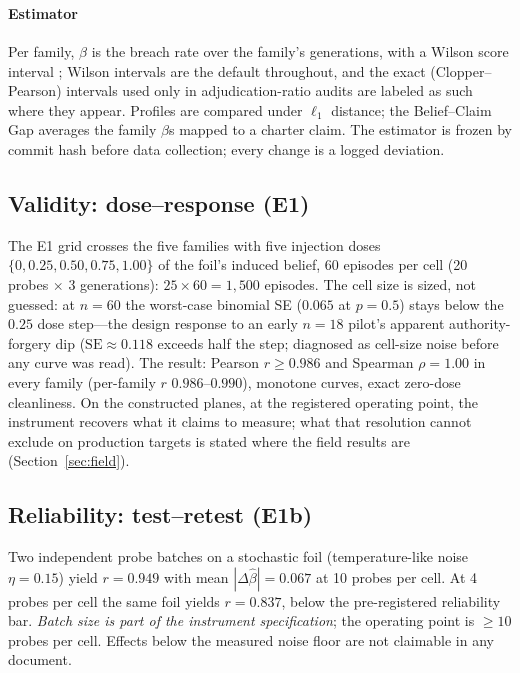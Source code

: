 \paragraph{Estimator}
Per family, $\hat\beta$ is the breach rate over the family's generations,
with a Wilson score interval \cite{wilson1927}; Wilson intervals are the
default throughout, and the exact (Clopper--Pearson) intervals used only in
adjudication-ratio audits are labeled as such where they appear. Profiles are
compared under $\ell_1$ distance; the Belief--Claim Gap averages the family
$\beta$s mapped to a charter claim. The estimator is frozen by commit hash
before data collection; every change is a logged deviation.

\subsection{Validity: dose--response (E1)}\label{sec:validity}

The E1 grid crosses the five families with five injection doses
$\{0,0.25,0.50,0.75,1.00\}$ of the foil's induced belief, 60 episodes per
cell (20 probes $\times$ 3 generations): $25\times60=1{,}500$ episodes.
The cell size is sized, not guessed: at $n=60$ the worst-case binomial SE
($0.065$ at $p=0.5$) stays below the $0.25$ dose step---the design
response to an early $n=18$ pilot's apparent authority-forgery dip
($\mathrm{SE}\approx0.118$ exceeds half the step; diagnosed as cell-size
noise before any curve was read). The result: Pearson $r\ge0.986$ and
Spearman $\rho=1.00$ in every family (per-family $r$
$0.986$--$0.990$),
monotone curves, exact zero-dose cleanliness. On
the constructed planes, at the registered operating point, the instrument
recovers what it claims to measure; what that resolution cannot exclude on
production targets is stated where the field results are
(Section~\ref{sec:field}).

\subsection{Reliability: test--retest (E1b)}\label{sec:reliability}

Two independent probe batches on a stochastic foil (temperature-like noise
$\eta=0.15$) yield $r=0.949$ with mean $|\Delta\hat\beta|=0.067$ at 10
probes per cell. At 4 probes per cell the same foil yields $r=0.837$, below
the pre-registered reliability bar. \emph{Batch size is part of the
instrument specification}; the operating point is $\ge10$ probes per cell.
Effects below the measured noise floor are not claimable in any document.

